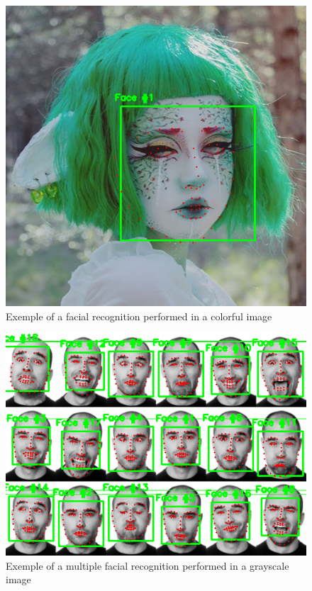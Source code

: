 \documentclass[12pt,a4paper]{article}
\begin{document}
    \begin{figure}[!hb]
        \centering
        \includegraphics[scale=0.5]{anzusc.png}
        \caption{Exemple of a facial recognition performed in a colorful image}
        \label{Anzu}
    \end{figure}

    \begin{figure}[!hb]
        \centering
        \includegraphics[scale=0.5]{multiple-faces.png}
        \caption{Exemple of a multiple facial recognition performed in a grayscale image}
        \label{Gray}
    \end{figure}
    
\end{document}
